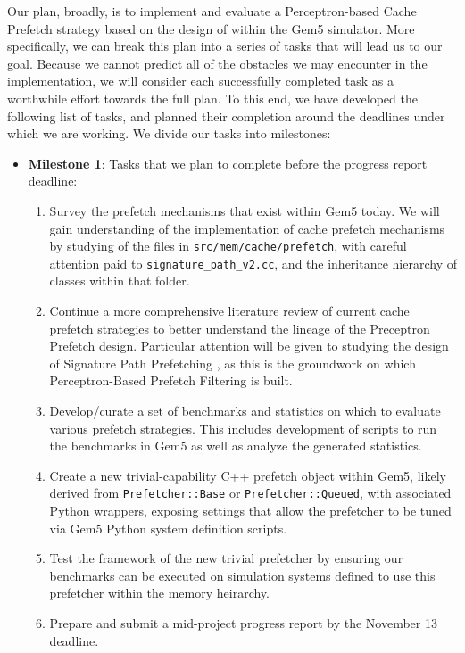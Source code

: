 \documentclass[conference]{IEEEtran}
\begin{document}
Our plan, broadly, is to implement and evaluate a Perceptron-based Cache Prefetch strategy based on the design of \cite{ppf} within the Gem5 simulator. More specifically, we can break this plan into a series of tasks that will lead us to our goal. Because we cannot predict all of the obstacles we may encounter in the implementation, we will consider each successfully completed task as a worthwhile effort towards the full plan. To this end, we have developed the following list of tasks, and planned their completion around the deadlines under which we are working. We divide our tasks into milestones: \begin{itemize}
\item\textbf{Milestone 1}: Tasks that we plan to complete before the progress report deadline:
  \begin{enumerate}
    \item Survey the prefetch mechanisms that exist within Gem5 today. We will gain understanding of the implementation of cache prefetch mechanisms by studying of the files in \texttt{src/mem/cache/prefetch}, with careful attention paid to \texttt{signature\_path\_v2.cc}, and the inheritance hierarchy of classes within that folder.
    \item Continue a more comprehensive literature review of current cache prefetch strategies to better understand the lineage of the Preceptron Prefetch design. Particular attention will be given to studying the design of Signature Path Prefetching \cite{SPP}, as this is the groundwork on which Perceptron-Based Prefetch Filtering is built.
    \item Develop/curate a set of benchmarks and statistics on which to evaluate various prefetch strategies. This includes development of scripts to run the benchmarks in Gem5 as well as analyze the generated statistics.
    \item Create a new trivial-capability C++ prefetch object within Gem5, likely derived from \texttt{Prefetcher::Base} or \texttt{Prefetcher::Queued}, with associated Python wrappers, exposing settings that allow the prefetcher to be tuned via Gem5 Python system definition scripts.
    \item Test the framework of the new trivial prefetcher by ensuring our benchmarks can be executed on simulation systems defined to use this prefetcher within the memory heirarchy.
    \item Prepare and submit a mid-project progress report by the November 13 deadline.
  \end{enumerate}

\end{itemize}
\end{document}
